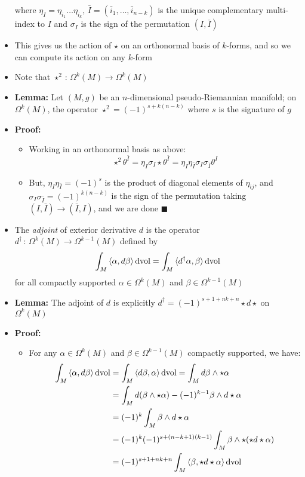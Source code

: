 \documentclass[12pt,a4paper]{article}
\numberwithin{equation}{section}
\begin{document}
\begin{itemize}
		where $\eta_{I}=\eta_{i_{1}}\ldots\eta_{i_{k}},\,\bar{I}=(\bar{i}_{1},\ldots,\bar{i}_{n-k})$ is the unique complementary multi-index to $I$ and $\sigma_{I}$ is the sign of the permutation $(I,\bar{I})$
		\item This gives us the action of $\star$ on an orthonormal basis of $k$-forms, and so we can compute its action on any $k$-form
		\item Note that $\star^{2}\,:\,\Omega^{k}(M)\to\Omega^{k}(M)$
		\item \textbf{Lemma:} Let $(M,g)$ be an $n$-dimensional pseudo-Riemannian manifold; on $\Omega^{k}(M)$, the operator $\star^{2}=(-1)^{s+k(n-k)}$ where $s$ is the signature of $g$
		\item \textbf{Proof:}
		\begin{itemize}
			\item Working in an orthonormal basis as above:
			\begin{equation}
				\star^{2}\theta^{\bar{I}}=\eta_{I}\sigma_{I}\star\theta^{\bar{I}}=\eta_{I}\eta_{\bar{I}}\sigma_{I}\sigma_{\bar{I}}\theta^{I}
			\end{equation}
			\item But, $\eta_{I}\eta_{\bar{I}}=(-1)^{s}$ is the product of diagonal elements of $\eta_{ij}$, and $\sigma_{I}\sigma_{\bar{I}}=(-1)^{k(n-k)}$ is the sign of the permutation taking $(I,\bar{I})\to(\bar{I},I)$, and we are done $\blacksquare$
		\end{itemize}
		\item The \textit{adjoint} of exterior derivative $d$ is the operator $d^{\dagger}\,:\,\Omega^{k}(M)\to\Omega^{k-1}(M)$ defined by
		\begin{equation}
			\int_{M}\braket{\alpha,d\beta}\text{dvol}=\int_{M}\braket{d^{\dagger}\alpha,\beta}\text{dvol}
		\end{equation}
		for all compactly supported $\alpha\in\Omega^{k}(M)$ and $\beta\in\Omega^{k-1}(M)$
		\item \textbf{Lemma:} The adjoint of $d$ is explicitly $d^{\dagger}=(-1)^{s+1+nk+n}\star d\star$ on $\Omega^{k}(M)$
		\item \textbf{Proof:}
		\begin{itemize}
			\item For any $\alpha\in\Omega^{k}(M)$ and $\beta\in\Omega^{k-1}(M)$ compactly supported, we have:
			\begin{equation}
				\begin{aligned}
					\int_{M}\braket{\alpha,d\beta}\text{dvol}&=\int_{M}\braket{d\beta,\alpha}\text{dvol}=\int_{M}d\beta\wedge\star\alpha\\&=\int_{M}d(\beta\wedge\star\alpha)-(-1)^{k-1}\beta\wedge d\star\alpha\\&=(-1)^{k}\int_{M}\beta\wedge d\star\alpha\\&=(-1)^{k}(-1)^{s+(n-k+1)(k-1)}\int_{M}\beta\wedge\star(\star d\star \alpha)\\&=(-1)^{s+1+nk+n}\int_{M}\braket{\beta,\star d\star\alpha}\text{dvol}

\end{aligned}
\end{equation}
\end{itemize}
\end{itemize}
\end{document}
